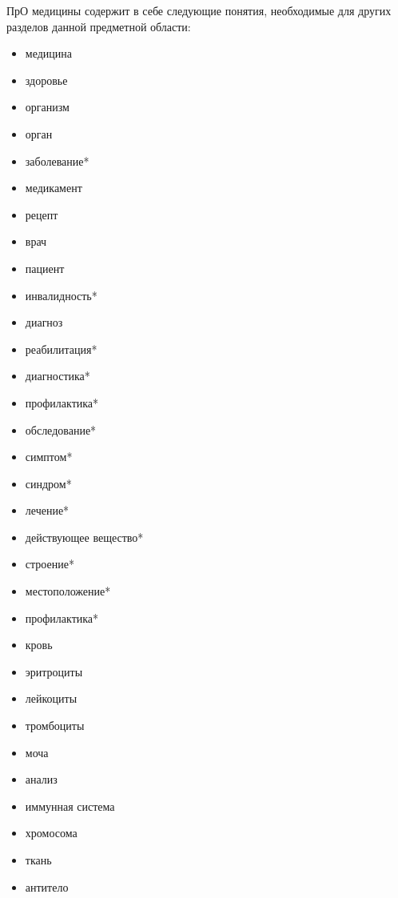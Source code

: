 ПрО медицины содержит в себе следующие понятия, необходимые для других разделов данной предметной области:
\begin{itemize}
	\item медицина
	\item здоровье
	\item организм 
	\item орган
	\item заболевание*
	\item медикамент
	\item рецепт
	\item врач
	\item пациент 
	\item инвалидность*
	\item диагноз
	\item реабилитация*
	\item диагностика*
	\item профилактика*
	\item обследование* 
	\item симптом*
	\item синдром*
	\item лечение* 
	\item действующее вещество*
	\item строение*
	\item местоположение*
	\item профилактика*
	\item кровь
	\item эритроциты
	\item лейкоциты
	\item тромбоциты
	\item моча
	\item анализ 
	\item иммунная система
	\item хромосома 
	\item ткань
	\item антитело\\
\end{itemize}

